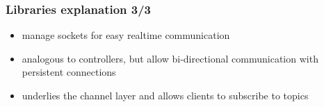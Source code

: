 \begin{frame}
    \frametitle{Libraries explanation 3/3}

    \begin{itemize}
        \item manage sockets for easy realtime communication
        \item analogous to controllers, but allow bi-directional communication with persistent connections
    \end{itemize}

    \vfill

    \begin{itemize}
        \item underlies the channel layer and allows clients to subscribe to topics
    \end{itemize}
\end{frame}